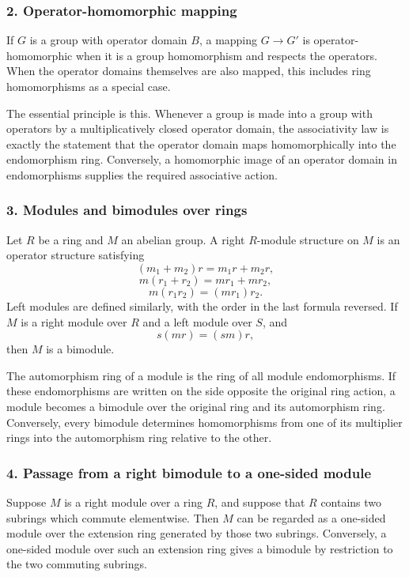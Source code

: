 \documentclass[11pt]{article}
\begin{document}
\subsubsection{2. Operator-homomorphic
mapping}\label{operator-homomorphic-mapping}

If \(G\) is a group with operator domain \(B\), a mapping \(G\to G'\) is
operator-homomorphic when it is a group homomorphism and respects the
operators. When the operator domains themselves are also mapped, this
includes ring homomorphisms as a special case.

The essential principle is this. Whenever a group is made into a group
with operators by a multiplicatively closed operator domain, the
associativity law is exactly the statement that the operator domain maps
homomorphically into the endomorphism ring. Conversely, a homomorphic
image of an operator domain in endomorphisms supplies the required
associative action.

\subsubsection{3. Modules and bimodules over
rings}\label{modules-and-bimodules-over-rings}

Let \(R\) be a ring and \(M\) an abelian group. A right \(R\)-module
structure on \(M\) is an operator structure satisfying \[
  (m_1+m_2)r=m_1r+m_2r,
\] \[
  m(r_1+r_2)=mr_1+mr_2,
\] \[
  m(r_1r_2)=(mr_1)r_2.
\] Left modules are defined similarly, with the order in the last
formula reversed. If \(M\) is a right module over \(R\) and a left
module over \(S\), and \[
  s(mr)=(sm)r,
\] then \(M\) is a bimodule.

The automorphism ring of a module is the ring of all module
endomorphisms. If these endomorphisms are written on the side opposite
the original ring action, a module becomes a bimodule over the original
ring and its automorphism ring. Conversely, every bimodule determines
homomorphisms from one of its multiplier rings into the automorphism
ring relative to the other.

\subsubsection{4. Passage from a right bimodule to a one-sided
module}\label{passage-from-a-right-bimodule-to-a-one-sided-module}

Suppose \(M\) is a right module over a ring \(R\), and suppose that
\(R\) contains two subrings which commute elementwise. Then \(M\) can be
regarded as a one-sided module over the extension ring generated by
those two subrings. Conversely, a one-sided module over such an
extension ring gives a bimodule by restriction to the two commuting
subrings.
\end{document}
